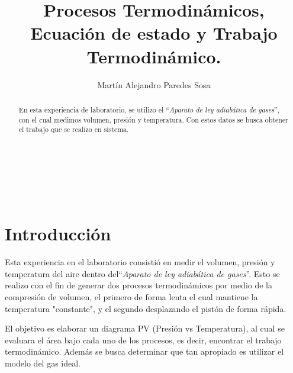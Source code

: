 \documentclass[12pt]{article}
\title{Procesos Termodinámicos, Ecuación de estado y Trabajo
Termodinámico.}
\author{Martín Alejandro Paredes Sosa}
\makeatletter
\let\thetitle\@title
\let\theauthor\@author
\makeatother
\begin{document}
\begin{center}
{ \large \bfseries \thetitle}\\
\end{center}
	\begin{minipage}{\textwidth}
		\begin{center} 
			\theauthor 
			\end{center}
	\end{minipage}\\[-0.52 cm]
\begin{abstract}
	En esta experiencia de laboratorio, se utilizo el ``\textit{Aparato de ley adiabática de gases}'', con el cual medimos volumen, presión y temperatura. Con estos datos se busca obtener el trabajo que se realizo en sistema.

\end{abstract}
\vspace{-1cm}
\section{Introducción}
\vspace{-0.5cm}
Esta experiencia en el laboratorio consistió en medir el volumen, presión y temperatura del aire dentro del``\textit{Aparato de ley adiabática de gases}''. Esto se realizo con el fin de generar dos procesos termodinámicos por medio de la compresión de volumen, el primero de forma lenta el cual mantiene la temperatura "constante", y el segundo desplazando el pistón de forma rápida.

\hspace{0.75cm} El objetivo es elaborar un diagrama PV (Presión vs Temperatura), al cual se evaluara el área bajo cada uno de los procesos, es decir, encontrar el trabajo termodinámico. Además se busca determinar que tan apropiado es utilizar el modelo del gas ideal.
\vspace{-0.5cm}
\end{document}
